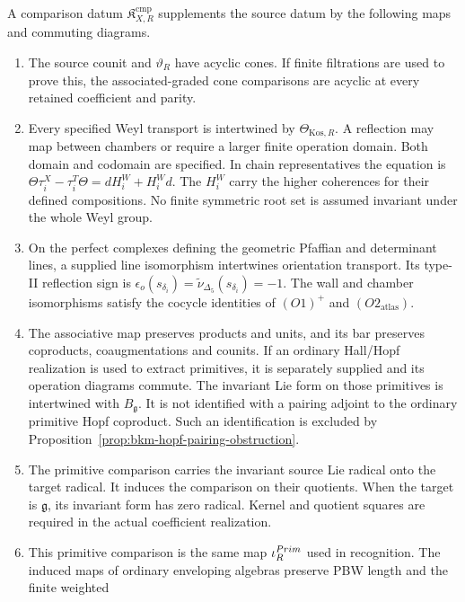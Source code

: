\begin{definition}
\label{def:finite-koszul-comparison-datum}
A comparison datum $\mathfrak K^{\mathrm{cmp}}_{X,R}$ supplements
the source datum by the following maps and commuting diagrams.
\begin{enumerate}
\item[\textup{(K0)}] The source counit and $\vartheta_R$ have
acyclic cones. If finite filtrations are used to prove this, the
associated-graded cone comparisons are acyclic at every retained
coefficient and parity.
\item[\textup{(K1)}] Every specified Weyl transport is intertwined
by $\Theta_{\mathrm{Kos},R}$. A reflection may map between chambers
or require a larger finite operation domain. Both domain and
codomain are specified. In chain representatives the equation is
$\Theta\tau_i^X-\tau_i^T\Theta=dH_i^W+H_i^Wd$.
The $H_i^W$ carry the higher coherences for their defined
compositions. No finite symmetric root set is assumed invariant
under the whole Weyl group.
\item[\textup{(K2)}] On the perfect complexes defining the geometric
Pfaffian and determinant lines, a supplied line isomorphism
intertwines orientation transport. Its type-II reflection sign is
$\epsilon_o(s_{\delta_i})=\widetilde\nu_{\Delta_5}(s_{\delta_i})=-1$.
The wall and chamber isomorphisms satisfy the cocycle identities of
$(O1)^+$ and $(O2_{\mathrm{atlas}})$.
\item[\textup{(K3)}] The associative map preserves products and
units, and its bar preserves coproducts, coaugmentations and
counits. If an ordinary Hall/Hopf realization is used to extract
primitives, it is separately supplied and its operation diagrams
commute. The invariant Lie form on those primitives is intertwined
with $B_{\mathfrak g}$. It is not identified with a pairing adjoint
to the ordinary primitive Hopf coproduct. Such an identification
is excluded by Proposition~\ref{prop:bkm-hopf-pairing-obstruction}.
\item[\textup{(K4)}] The primitive comparison carries the invariant source Lie radical
onto the target radical. It induces the comparison on their quotients.
When the target is $\mathfrak g$, its invariant form has zero
radical. Kernel and quotient squares are required in the actual
coefficient realization.
\item[\textup{(K5)}] This primitive comparison is the same map
$\iota_R^{Prim}$ used in recognition. The induced maps of ordinary
enveloping algebras preserve PBW length and the finite weighted

\end{enumerate}
\end{definition}
